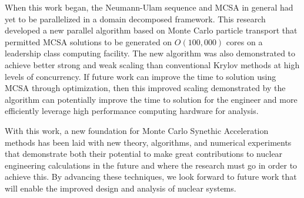 When this work began, the Neumann-Ulam sequence and MCSA in general
had yet to be parallelized in a domain decomposed framework. This
research developed a new parallel algorithm based on Monte Carlo
particle transport that permitted MCSA solutions to be generated on
$O(100,000)$ cores on a leadership class computing facility. The new
algorithm was also demonstrated to achieve better strong and weak
scaling than conventional Krylov methods at high levels of
concurrency. If future work can improve the time to solution using
MCSA through optimization, then this improved scaling demonstrated by
the algorithm can potentially improve the time to solution for the
engineer and more efficiently leverage high performance computing
hardware for analysis.

With this work, a new foundation for Monte Carlo Synethic Acceleration
methods has been laid with new theory, algorithms, and numerical
experiments that demonstrate both their potential to make great
contributions to nuclear engineering calculations in the future and
where the research must go in order to achieve this. By advancing
these techniques, we look forward to future work that will enable the
improved design and analysis of nuclear systems.
